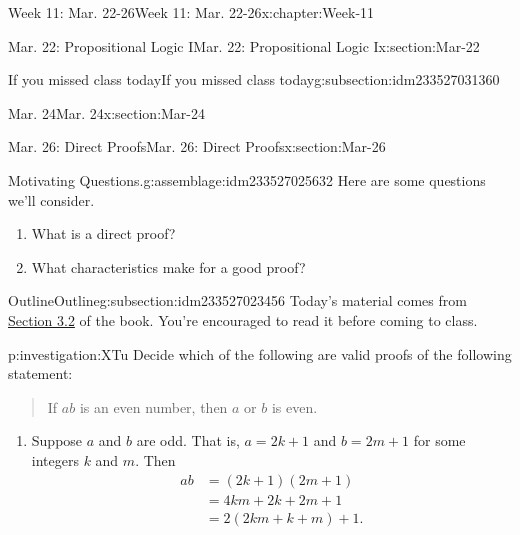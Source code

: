 \documentclass[oneside,10pt,]{book}
\numberwithin{equation}{section}
\newcommand{\amp}{&}
\begin{document}
\begin{chapterptx}{Week 11: Mar. 22-26}{}{Week 11: Mar. 22-26}{}{}{x:chapter:Week-11}
\begin{sectionptx}{Mar. 22: Propositional Logic I}{}{Mar. 22: Propositional Logic I}{}{}{x:section:Mar-22}
\begin{subsectionptx}{If you missed class today}{}{If you missed class today}{}{}{g:subsection:idm233527031360}
\end{subsectionptx}
\end{sectionptx}
%
%
\typeout{************************************************}
\typeout{************************************************}
%
\begin{sectionptx}{Mar. 24}{}{Mar. 24}{}{}{x:section:Mar-24}
\end{sectionptx}
%
%
\typeout{************************************************}
\typeout{************************************************}
%
\begin{sectionptx}{Mar. 26: Direct Proofs}{}{Mar. 26: Direct Proofs}{}{}{x:section:Mar-26}
\begin{introduction}{}%
\begin{assemblage}{Motivating Questions.}{g:assemblage:idm233527025632}%
Here are some questions we'll consider. %
\begin{enumerate}
\item{}What is a direct proof?%
\item{}What characteristics make for a good proof?%
\end{enumerate}
%
\end{assemblage}
\end{introduction}%
%
%
\typeout{************************************************}
\typeout{************************************************}
%
\begin{subsectionptx}{Outline}{}{Outline}{}{}{g:subsection:idm233527023456}
Today's material comes from \href{http://discrete.openmathbooks.org/dmoi3/sec_logic-proofs.html}{Section 3.2} of the book. You're encouraged to read it before coming to class.%
\begin{investigation}{}{p:investigation:XTu}%
Decide which of the following are valid proofs of the following statement:%
\begin{quote}%
If \(a b\) is an even number, then \(a\) or \(b\) is even.%
\end{quote}
%
\begin{enumerate}
\item{}Suppose \(a\) and \(b\) are odd. That is, \(a=2k+1\) and \(b=2m+1\) for some integers \(k\) and \(m\). Then%
\begin{align*}
ab \amp =(2k+1)(2m+1)\\
\amp =4km+2k+2m+1\\
\amp =2(2km+k+m)+1\text{.}
\end{align*}

\end{enumerate}
\end{investigation}
\end{subsectionptx}
\end{sectionptx}
\end{chapterptx}
\end{document}
